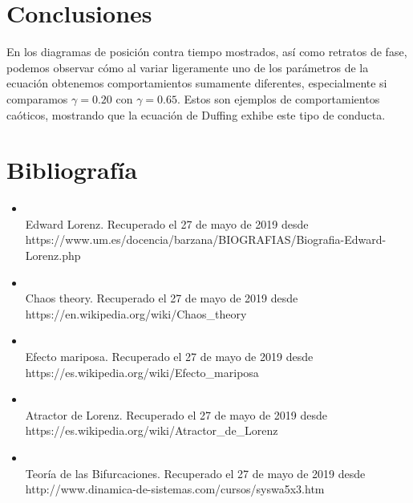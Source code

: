 \documentclass[letterpaper,12pt]{article}
\begin{document}
\section{Conclusiones}
En los diagramas de posición contra tiempo mostrados, así como retratos de fase, podemos observar cómo al variar ligeramente uno de los parámetros de la ecuación obtenemos comportamientos sumamente diferentes, especialmente si comparamos $\gamma=0.20$ con $\gamma=0.65$. Estos son ejemplos de comportamientos caóticos, mostrando que la ecuación de Duffing exhibe este tipo de conducta.

\section*{Bibliografía}
\begin{itemize}
\item \\Edward Lorenz. Recuperado el 27 de mayo de 2019 desde \\https://www.um.es/docencia/barzana/BIOGRAFIAS/Biografia-Edward-Lorenz.php
\\

\item \\Chaos theory. Recuperado el 27 de mayo de 2019 desde \\https://en.wikipedia.org/wiki/Chaos\_theory
\\

\item \\Efecto mariposa. Recuperado el 27 de mayo de 2019 desde \\https://es.wikipedia.org/wiki/Efecto\_mariposa
\\

\item \\Atractor de Lorenz. Recuperado el 27 de mayo de 2019 desde \\https://es.wikipedia.org/wiki/Atractor\_de\_Lorenz
\\

\item \\Teoría de las Bifurcaciones. Recuperado el 27 de mayo de 2019 desde \\http://www.dinamica-de-sistemas.com/cursos/syswa5x3.htm
\\




\end{itemize}
\end{document}
